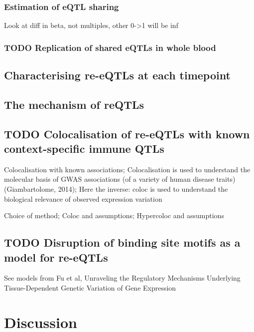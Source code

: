 
\subsubsection{Estimation of eQTL sharing}


Look at diff in beta, not multiples, other 0->1 will be inf

\subsubsection{TODO Replication of shared eQTLs in whole blood}

\subsection{Characterising re-eQTLs at each timepoint}

\subsection{The mechanism of reQTLs}

\subsection{TODO Colocalisation of re-eQTLs with known context-specific immune QTLs}

Colocalisation with known associations;
Colocalisation is used to understand the molecular basis of GWAS associations (of a variety of human disease traits) (Giambartolome, 2014);
Here the inverse: coloc is used to understand the biological relevance of observed expression variation

Choice of method; 
Coloc and assumptions; Hypercoloc and assumptions


\subsection{TODO Disruption of binding site motifs as a model for re-eQTLs}

See models from Fu et al, Unraveling the Regulatory Mechanisms Underlying Tissue-Dependent Genetic Variation of Gene Expression

\section{Discussion}

